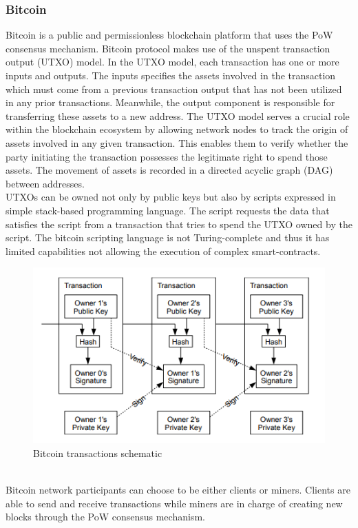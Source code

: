 \subsubsection{Bitcoin}
Bitcoin is a public and permissionless blockchain platform that uses the PoW consensus mechanism. Bitcoin protocol makes use of the unspent transaction output (UTXO) model.
In the UTXO model, each transaction has one or more inputs and outputs. The inputs specifies the assets involved in the transaction which must come from a previous transaction output that has not been utilized
in any prior transactions. Meanwhile, the output component is responsible for transferring these assets to a new address. The UTXO model serves a crucial role within the blockchain ecosystem by allowing
network nodes to track the origin of assets involved in any given transaction. This enables them to verify whether the party initiating the transaction possesses the legitimate right to spend those assets.
The movement of assets is recorded in a directed acyclic graph (DAG) between addresses.\\
UTXOs can be owned not only by public keys but also by scripts expressed in simple stack-based programming language. The script requests the data that satisfies the script from a transaction that tries to
spend the UTXO owned by the script. The bitcoin scripting language is not Turing-complete and thus it has limited capabilities not allowing the execution of complex smart-contracts.
\cite{blockchainTech,wang2017novel}
\begin{figure}[h!]
    \centering
    \includegraphics[scale=0.8]{Figures/bitcoin_transactions.png}
    \caption{Bitcoin transactions schematic \cite{Nakamoto}}
\end{figure}\\
Bitcoin network participants can choose to be either clients or miners. Clients are able to send and receive transactions while miners are in charge of creating new blocks through the PoW consensus mechanism.

